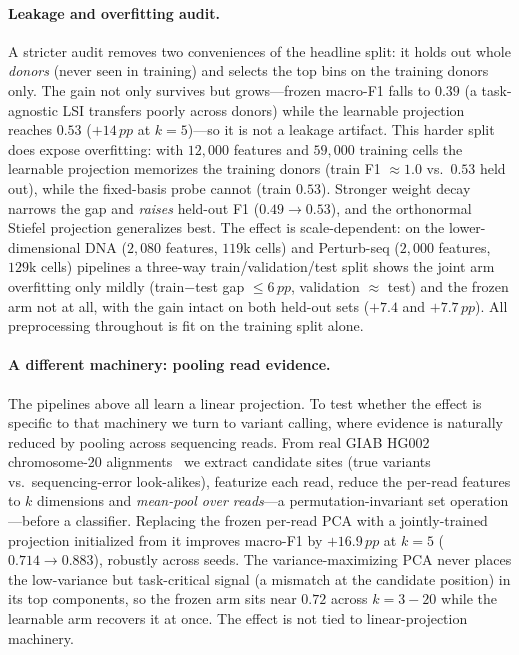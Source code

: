 \documentclass[10pt,twocolumn]{article}
\newcommand{\pp}{\,pp}
\begin{document}
\paragraph{Leakage and overfitting audit.} A stricter audit removes two conveniences of the
headline split: it holds out whole \emph{donors} (never seen in training) and selects the
top bins on the training donors only. The gain not only survives but grows---frozen macro-F1
falls to $0.39$ (a task-agnostic LSI transfers poorly across donors) while the learnable
projection reaches $0.53$ ($+14\pp$ at $k{=}5$)---so it is not a leakage artifact. This
harder split does expose overfitting: with $12{,}000$ features and $59{,}000$ training cells
the learnable projection memorizes the training donors (train F1 $\approx1.0$ vs.\ $0.53$
held out), while the fixed-basis probe cannot (train $0.53$). Stronger weight decay narrows
the gap and \emph{raises} held-out F1 ($0.49\!\to\!0.53$), and the orthonormal Stiefel
projection generalizes best. The effect is scale-dependent: on the lower-dimensional DNA
($2{,}080$ features, $119$k cells) and Perturb-seq ($2{,}000$ features, $129$k cells)
pipelines a three-way train/validation/test split shows the joint arm overfitting only
mildly (train$-$test gap $\le\!6\pp$, validation $\approx$ test) and the frozen arm not at
all, with the gain intact on both held-out sets ($+7.4$ and $+7.7\pp$). All preprocessing
throughout is fit on the training split alone.

\paragraph{A different machinery: pooling read evidence.} The pipelines above all learn a
linear projection. To test whether the effect is specific to that machinery we turn to
variant calling, where evidence is naturally reduced by pooling across sequencing reads.
From real GIAB HG002 chromosome-20 alignments~\citep{zook2019giab} we extract candidate
sites (true variants vs.\ sequencing-error look-alikes), featurize each read, reduce the
per-read features to $k$ dimensions and \emph{mean-pool over reads}---a permutation-invariant
set operation---before a classifier. Replacing the frozen per-read PCA with a jointly-trained
projection initialized from it improves macro-F1 by $+16.9\pp$ at $k{=}5$
($0.714\!\to\!0.883$), robustly across seeds. The variance-maximizing PCA never places the
low-variance but task-critical signal (a mismatch at the candidate position) in its top
components, so the frozen arm sits near $0.72$ across $k{=}3\!-\!20$ while the learnable arm
recovers it at once. The effect is not tied to linear-projection machinery.
\end{document}
